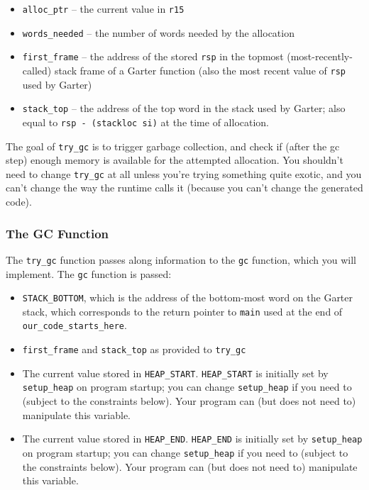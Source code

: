 \documentclass[10pt, oneside]{article}
\begin{document}
\begin{itemize}
\item {\tt alloc\_ptr} -- the current value in {\tt r15}
\item {\tt words\_needed} -- the number of words needed by the allocation
\item {\tt first\_frame} -- the address of the stored {\tt rsp} in the
topmost (most-recently-called) stack frame of a Garter function (also the
most recent value of {\tt rsp} used by Garter)
\item {\tt stack\_top} -- the address of the top word in the stack
used by Garter; also equal to {\tt rsp - (stackloc si)} at the time of allocation.
\end{itemize}

The goal of {\tt try\_gc} is to trigger garbage collection, and check if
(after the gc step) enough memory is available for the attempted allocation.
You shouldn't need to change {\tt try\_gc} at all unless you're trying
something quite exotic, and you can't change the way the runtime calls it
(because you can't change the generated code).

\subsubsection*{The GC Function}

The {\tt try\_gc} function passes along information to the {\tt gc} function,
which you will implement. The {\tt gc} function is passed:

\begin{itemize}
\item {\tt STACK\_BOTTOM}, which is the address of the bottom-most word on
the Garter stack, which corresponds to the return pointer to {\tt main} used
at the end of {\tt our\_code\_starts\_here}.
\item {\tt first\_frame} and {\tt stack\_top} as provided to {\tt try\_gc}
\item The current value stored in {\tt HEAP\_START}. {\tt HEAP\_START} is initially set
by {\tt setup\_heap} on program startup; you can change {\tt setup\_heap} if
you need to (subject to the constraints below). Your program can (but does
not need to) manipulate this variable.
\item The current value stored in {\tt HEAP\_END}. {\tt HEAP\_END} is initially set
by {\tt setup\_heap} on program startup; you can change {\tt setup\_heap} if
you need to (subject to the constraints below). Your program can (but does
not need to) manipulate this variable.
\end{itemize}
\end{document}
